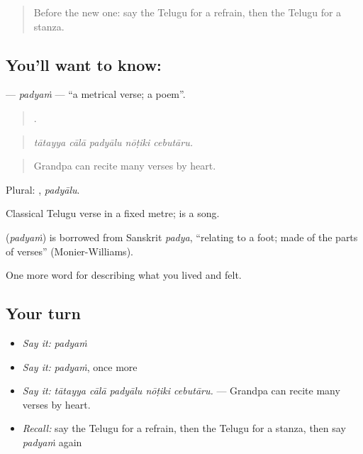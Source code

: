 \label{lesson:TE-C539-padyam}



\begin{quote}
Before the new one: say the Telugu for a refrain, then the Telugu for a stanza.
\end{quote}

\subsection*{You'll want to know: }
\textbf{} — \emph{padyaṁ} — \textquotedblleft{}a metrical verse; a poem\textquotedblright{}.

\begin{quote}
    .
\end{quote}

\begin{quote}
\emph{tātayya cālā padyālu nōṭiki cebutāru.}
\end{quote}

\begin{quote}
Grandpa can recite many verses by heart.
\end{quote}

Plural: , \emph{padyālu}.

Classical Telugu verse in a fixed metre;  is a song.

\begin{cousinweb}
\textbf{} (\emph{padyaṁ}) is borrowed from Sanskrit \emph{padya}, \textquotedblleft{}relating to a foot; made of the parts of verses\textquotedblright{} (Monier-Williams).
\end{cousinweb}

\begin{grammarlens}[title={What you've built}]
One more word for describing what you lived and felt.
\end{grammarlens}

\subsection*{Your turn}
\begin{itemize}
\raggedright
  \item \emph{Say it:} \emph{padyaṁ}
  \item \emph{Say it:} \emph{padyaṁ}, once more
  \item \emph{Say it:} \emph{tātayya cālā padyālu nōṭiki cebutāru.} — Grandpa can recite many verses by heart.
  \item \emph{Recall:} say the Telugu for a refrain, then the Telugu for a stanza, then say \emph{padyaṁ} again
\end{itemize}

